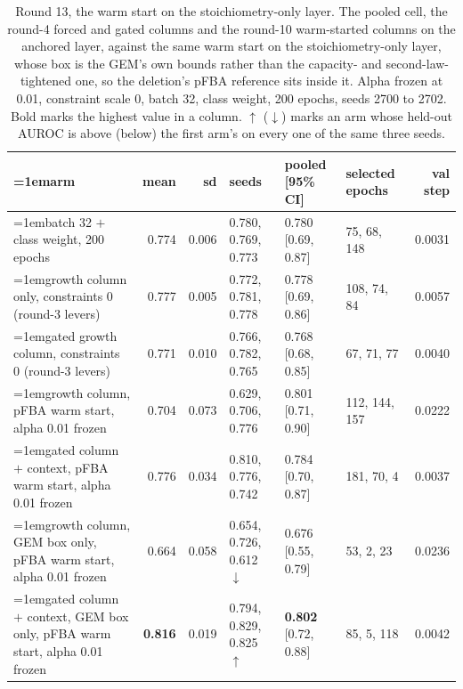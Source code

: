 \begin{table}[H]
  \centering
  \scriptsize
  \setlength{\tabcolsep}{2.5pt}
  \caption[Round 13, the warm start on the stoichiometry-only layer]{Round 13, the warm start on the stoichiometry-only layer. The pooled cell, the round-4 forced and gated columns and the round-10 warm-started columns on the anchored layer, against the same warm start on the stoichiometry-only layer, whose box is the GEM's own bounds rather than the capacity- and second-law-tightened one, so the deletion's pFBA reference sits inside it. Alpha frozen at 0.01, constraint scale 0, batch 32, class weight, 200 epochs, seeds 2700 to 2702. Bold marks the highest value in a column. $\uparrow$ ($\downarrow$) marks an arm whose held-out AUROC is above (below) the first arm's on every one of the same three seeds.}
  \label{tab:w24}
  \begin{tabular}{@{}>{\raggedright\hangindent=1em\hangafter=1\arraybackslash}p{81.1mm}rrlllr@{}}
    \hline
    arm & mean & sd & seeds & pooled [95\% CI] & selected epochs & val step \\
    \hline
    batch 32 $+$ class weight, 200 epochs & 0.774 & 0.006 & 0.780, 0.769, 0.773 & 0.780 [0.69, 0.87] & 75, 68, 148 & 0.0031 \\
    growth column only, constraints 0 (round-3 levers) & 0.777 & 0.005 & 0.772, 0.781, 0.778 & 0.778 [0.69, 0.86] & 108, 74, 84 & 0.0057 \\
    gated growth column, constraints 0 (round-3 levers) & 0.771 & 0.010 & 0.766, 0.782, 0.765 & 0.768 [0.68, 0.85] & 67, 71, 77 & 0.0040 \\
    growth column, pFBA warm start, alpha 0.01 frozen & 0.704 & 0.073 & 0.629, 0.706, 0.776 & 0.801 [0.71, 0.90] & 112, 144, 157 & 0.0222 \\
    gated column $+$ context, pFBA warm start, alpha 0.01 frozen & 0.776 & 0.034 & 0.810, 0.776, 0.742 & 0.784 [0.70, 0.87] & 181, 70, 4 & 0.0037 \\
    growth column, GEM box only, pFBA warm start, alpha 0.01 frozen & 0.664 & 0.058 & 0.654, 0.726, 0.612 $\downarrow$ & 0.676 [0.55, 0.79] & 53, 2, 23 & 0.0236 \\
    gated column $+$ context, GEM box only, pFBA warm start, alpha 0.01 frozen & \textbf{0.816} & 0.019 & 0.794, 0.829, 0.825 $\uparrow$ & \textbf{0.802} [0.72, 0.88] & 85, 5, 118 & 0.0042 \\
    \hline
  \end{tabular}
\end{table}
